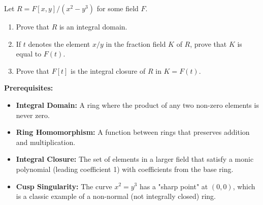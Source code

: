 \begin{exercise}
\label{algebra:2021:3}
Let $R = F[x, y]/(x^2 - y^3)$ for some field $F$.

\begin{enumerate}
\item[(a)] Prove that $R$ is an integral domain.

\item[(b)] If $t$ denotes the element $x/y$ in the fraction field $K$ of $R$, prove that $K$ is equal to $F(t)$.

\item[(c)] Prove that $F[t]$ is the integral closure of $R$ in $K = F(t)$.
\end{enumerate}
\end{exercise}

\begin{solution}
\textbf{Prerequisites:}
\begin{itemize}
    \item \textbf{Integral Domain:} A ring where the product of any two non-zero elements is never zero.
    \item \textbf{Ring Homomorphism:} A function between rings that preserves addition and multiplication.
    \item \textbf{Integral Closure:} The set of elements in a larger field that satisfy a monic polynomial (leading coefficient 1) with coefficients from the base ring.
    \item \textbf{Cusp Singularity:} The curve $x^2 = y^3$ has a "sharp point" at $(0,0)$, which is a classic example of a non-normal (not integrally closed) ring.
\end{itemize}


\end{solution}
